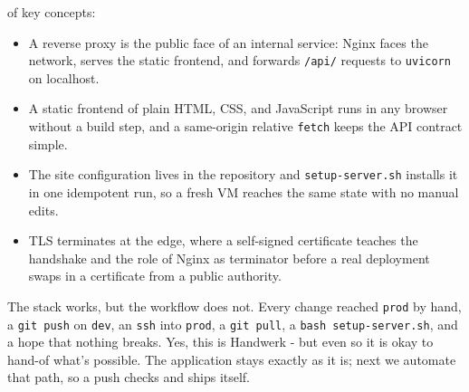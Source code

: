 
 of key concepts:
\begin{itemize}
    \item A reverse proxy is the public face of an internal service: Nginx faces the network, serves the static frontend, and forwards \texttt{/api/} requests to \texttt{uvicorn} on localhost.
    \item A static frontend of plain HTML, CSS, and JavaScript runs in any browser without a build step, and a same-origin relative \texttt{fetch} keeps the API contract simple.
    \item The site configuration lives in the repository and \texttt{setup-server.sh} installs it in one idempotent run, so a fresh VM reaches the same state with no manual edits.
    \item TLS terminates at the edge, where a self-signed certificate teaches the handshake and the role of Nginx as terminator before a real deployment swaps in a certificate from a public authority.
\end{itemize}


 The stack works, but the workflow does not.
Every change reached \texttt{prod} by hand, a \texttt{git push} on
\texttt{dev}, an \texttt{ssh} into \texttt{prod}, a \texttt{git pull}, a
\texttt{bash setup-server.sh}, and a hope that nothing breaks. Yes, this is Handwerk
- but even so it is okay to hand-of what's possible.
The application stays exactly as it is; next we automate that
path, so a push checks and ships itself.
